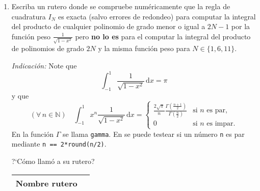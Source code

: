 \documentclass[legalpaper,11pt]{article}
\begin{document}
\begin{enumerate}
\begin{enumerate}
Por ejemplo, si su funci\'on se llama \texttt{weightedquad}, deber\'ia poder usarse de la siguiente manera:
\begin{Verbatim}[frame=single]
>> weightedquad(@(x) x.^0, 10) % "@(x) x.^0" es la funci\'on 1 vectorizada

ans =

    3.1416

>> weightedquad(@(x) x.^3, 5)

ans =

   1.3951e-16
\end{Verbatim}

\medskip

?`C\'omo llam\'o a su funci\'on?

\begin{tabularx}{\linewidth}{|p{7em}|X|}\hline
Nombre funci\'on & \\\hline
\end{tabularx}

\medskip

\item {} Escriba un rutero \matlab donde se compruebe num\'ericamente que la regla de cuadratura $I_N$ es exacta (salvo errores de redondeo) para computar la integral del producto de cualquier polinomio de grado menor o igual a $2N-1$ por la funci\'on peso $\frac{1}{\sqrt{1-x^2}}$ pero \textbf{no lo es} para el computar la integral del producto de polinomios de grado $2N$ y la misma funci\'on peso para $N \in \{1, 6, 11\}$.

\emph{Indicaci\'on:} Note que
%
\begin{equation*}
\int_{-1}^1 \frac{1}{\sqrt{1-x^2}} \, \mathrm{d}x = \pi
\end{equation*}
%
y que
%
\begin{equation*}
(\forall\,n\in\mathbb{N}) \quad
\int_{-1}^1 x^n \frac{1}{\sqrt{1-x^2}} \, \mathrm{d}x
= \begin{cases}
\frac{2\sqrt{\pi}}{n} \frac{\Gamma\left(\frac{n+1}{2}\right)}{\Gamma\left(\frac{n}{2}\right)} & \text{si $n$ es par,}\\
0 & \text{si $n$ es impar.}
\end{cases}
\end{equation*}
%
En \matlab la funci\'on $\Gamma$ se llama \texttt{gamma}.
En \matlab se puede testear si un n\'umero \texttt{n} es par mediante \texttt{n == 2*round(n/2)}.

\medskip

?`C\'omo llam\'o a su rutero?

\begin{tabularx}{\linewidth}{|p{7em}|X|}\hline
Nombre rutero & \\\hline
\end{tabularx}


\end{enumerate}
\end{enumerate}
\end{document}
